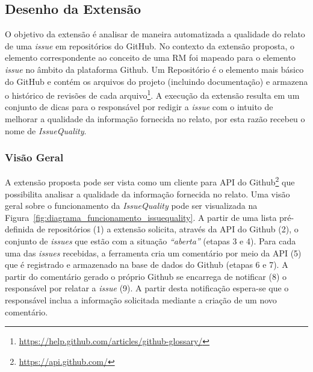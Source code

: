 
\subsection{Desenho da Extensão}
\label{sub:desenho_da_extensao}

O objetivo da extensão é analisar de maneira automatizada a qualidade do relato
de uma \textit{issue} em repositórios do GitHub. No contexto da extensão
proposta, o elemento correspondente ao conceito de uma RM foi mapeado para o
elemento \textit{issue} no âmbito da plataforma Github. Um Repositório é o
elemento mais básico do GitHub e contém os arquivos do projeto (incluindo
documentação) e armazena o histórico de revisões de cada
arquivo\footnote{\url{https://help.github.com/articles/github-glossary/}}. A
execução da extensão resulta em um conjunto de dicas para o responsável por
redigir a \textit{issue} com o intuito de melhorar a qualidade da informação
fornecida no relato, por esta razão recebeu o nome de \textit{IssueQuality}.

\subsubsection{Visão Geral}
\label{ssub:implementacao_extensao_visao_geral}

A extensão proposta pode ser vista como um cliente para API do
Github\footnote{\url{https://api.github.com/}} que possibilita analisar a
qualidade da informação fornecida no relato. Uma visão geral sobre o
funcionamento da \textit{IssueQuality} pode ser visualizada na
Figura~\ref{fig:diagrama_funcionamento_issuequality}. A partir de uma lista
pré-definida de repositórios (1) a extensão solicita, através da API do Github
(2), o conjunto de \textit{issues} que estão com a situação \textit{``aberta''}
(etapas 3 e 4). Para cada uma das \textit{issues} recebidas, a ferramenta cria
um comentário por meio da API (5) que é registrado e armazenado na base de dados
do Github (etapas 6 e 7). A partir do comentário gerado o próprio Github se
encarrega de notificar (8) o responsável por relatar a \textit{issue} (9). A
partir desta notificação espera-se que o responsável inclua a informação
solicitada mediante a criação de um novo comentário.

